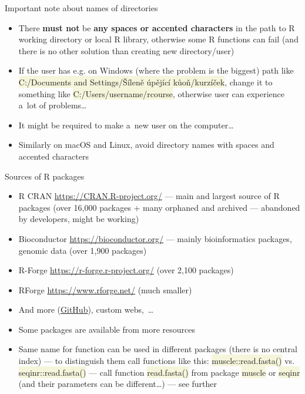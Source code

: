 \documentclass[compress, ucs, xelatex, 11pt, xcolor=svgnames, aspectratio=169,
	hyperref={
		bookmarks=true,
		unicode=true,
		colorlinks=true,
		pdftitle={Molecular data in R},
		plainpages=false,
		pdfauthor={Vojtech Zeisek},
		pdfsubject={Course about phylogeny and evolution in R},
		pdfcreator={XeLaTeX},
		pdfkeywords={R, evolution, phylogeny, molecular data},
		linkcolor=Crimson, %
		anchorcolor=Magenta, %
		citecolor=Magenta, %
		filecolor=Magenta, %
		menucolor=Magenta, %
		urlcolor=DodgerBlue, %
		pdftex},
	url={hyphens, lowtilde} %
	]{beamer}
\renewcommand{\texttt}[1]{\colorbox{Beige}{{\ttfamily #1}}}
\begin{document}
\begin{frame}{Important note about names of directories}
	\begin{itemize}
		\item \alert{There \textbf{must not} be \textbf{any spaces or accented characters} in the path to R working directory or local R library}, otherwise some R functions can fail (and there is no other solution than creating new directory/user)
		\item If the user has e.g. on Windows (where the problem is the biggest) path like \texttt{C:/Documents and Settings/Šíleně úpějící kůoň/kurzíček}, change it to something like \texttt{C:/Users/username/rcourse}, otherwise user can experience a~lot of problems\ldots
		\item It might be required to make a~new user on the computer\ldots
		\item Similarly on macOS and Linux, avoid directory names with spaces and accented characters
	\end{itemize}
\end{frame}

\begin{frame}{Sources of R packages}
	\label{sources}
	\begin{itemize}
		\item R CRAN \url{https://CRAN.R-project.org/} --- main and largest source of R packages (over 16,000 packages + many orphaned and archived --- abandoned by developers, might be working)
		\item Bioconductor \url{https://bioconductor.org/} --- mainly bioinformatics packages, genomic data (over 1,900 packages)
		\item R-Forge \url{https://r-forge.r-project.org/} (over 2,100 packages)
		\item RForge \url{https://www.rforge.net/} (much smaller)
		\item And more (\href{https://github.com/}{GitHub}), custom webs,~\ldots
		\item Some packages are available from more resources
		\item Same name for function can be used in different packages (there is no central index) --- to distinguish them call functions like this: \texttt{muscle::read.fasta()} vs. \texttt{seqinr::read.fasta()} --- call function \texttt{read.fasta()} from package \texttt{muscle} \alert{or} \texttt{seqinr} (and their parameters can be different\ldots) --- see further
	\end{itemize}
\end{frame}
\end{document}
